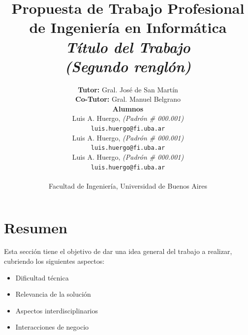 \documentclass[12pt]{article}
\begin{document}
\begin{titlepage}

\title{     \textbf{Propuesta de Trabajo Profesional \\ de Ingeniería en Informática}\\[2.5ex]
\textit{Título del Trabajo \\(Segundo renglón)} }

\author{    
             \textbf{Tutor:} Gral. José de San Martín \\[2.5ex]
             \textbf{Co-Tutor:} Gral. Manuel Belgrano \\[2.5ex]
             \textbf{Alumnos} \\[2.5ex]  
             Luis A. Huergo, \textit{(Padrón \# 000.001)}\\ \texttt{ luis.huergo@fi.uba.ar } \\[2.5ex]
             Luis A. Huergo, \textit{(Padrón \# 000.001)}\\ \texttt{ luis.huergo@fi.uba.ar }\\[2.5ex]
             Luis A. Huergo, \textit{(Padrón \# 000.001)}\\ \texttt{ luis.huergo@fi.uba.ar }\\[2.5ex] 
                                                       \\[2.5ex]
            \normalsize{Facultad de Ingeniería, Universidad de Buenos Aires}        \\
       }
\date{}

\end{titlepage}

\maketitle
\thispagestyle{empty} 

\maketitle

{
  \hypersetup{linkcolor=black}
  \tableofcontents
}


\section{Resumen}

Esta sección tiene el objetivo de dar una idea general del trabajo a realizar, cubriendo los siguientes aspectos:
\begin{itemize}
    \item Dificultad técnica
    \item Relevancia de la solución
    \item Aspectos interdisciplinarios
    \item Interacciones de negocio
\end{itemize}
\end{document}
